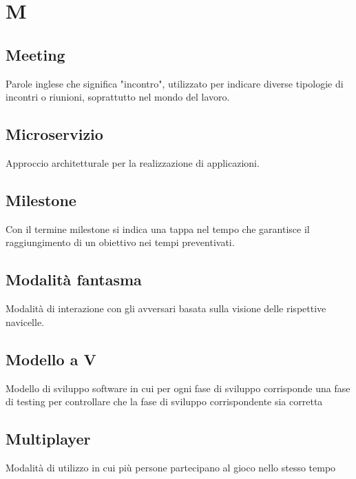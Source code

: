 \section{M}
	\subsection{Meeting}
		Parole inglese che significa "incontro", utilizzato per indicare diverse tipologie di incontri o riunioni, soprattutto nel mondo del lavoro.
	\subsection{Microservizio}
		Approccio architetturale per la realizzazione di applicazioni.
	\subsection{Milestone}  
		Con il termine milestone si indica una tappa nel tempo che garantisce il raggiungimento di un obiettivo nei tempi preventivati.
    \subsection{Modalità fantasma}
        Modalità di interazione con gli avversari basata sulla visione delle rispettive navicelle.
	\subsection{Modello a V}  
		Modello di sviluppo software in cui per ogni fase di sviluppo corrisponde una fase di testing per controllare che la fase di sviluppo corrispondente sia corretta
	\subsection{Multiplayer}
		Modalità di utilizzo in cui più persone partecipano al gioco nello stesso tempo

\newpage